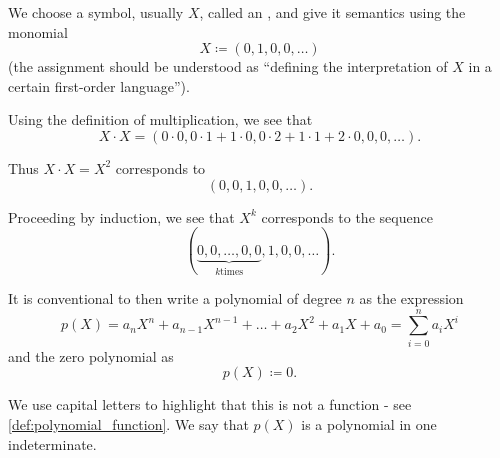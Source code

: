 \begin{remark}\label{remark:polynomial_symbolic_expression}
  We choose a symbol, usually \( X \), called an , and give it semantics using the monomial
  \begin{equation*}
    X \coloneqq (0, 1, 0, 0, \ldots)
  \end{equation*}
  (the assignment should be understood as \enquote{defining the interpretation of \( X \) in a certain first-order language}).

  Using the definition of multiplication, we see that
  \begin{equation*}
    X \cdot X = (0 \cdot 0, 0 \cdot 1 + 1 \cdot 0, 0 \cdot 2 + 1 \cdot 1 + 2 \cdot 0, 0, 0, \ldots).
  \end{equation*}

  Thus \( X \cdot X = X^2 \) corresponds to
  \begin{equation*}
    (0, 0, 1, 0, 0, \ldots).
  \end{equation*}

  Proceeding by induction, we see that \( X^k \) corresponds to the sequence
  \begin{equation*}
    (\underbrace{0, 0, \ldots, 0, 0}_{k \text{times}}, 1, 0, 0, \ldots).
  \end{equation*}

  It is conventional to then write a polynomial of degree \( n \) as the expression
  \begin{equation*}
    p(X) = a_n X^n + a_{n-1} X^{n-1} + \ldots + a_2 X^2 + a_1 X + a_0 = \sum_{i=0}^n a_i X^i
  \end{equation*}
  and the zero polynomial as
  \begin{equation*}
    p(X) \coloneqq 0.
  \end{equation*}

  We use capital letters to highlight that this is not a function - see \cref{def:polynomial_function}. We say that \( p(X) \) is a polynomial in one indeterminate.
\end{remark}

